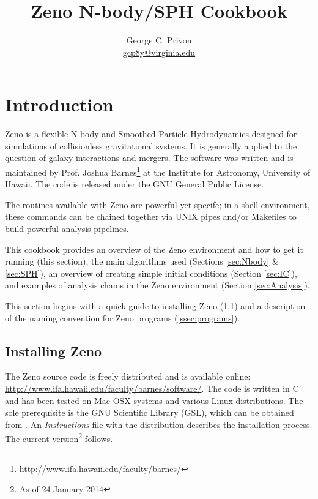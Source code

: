 \documentclass[11pt,letterpaper]{article}
\begin{document}
\title{Zeno N-body/SPH Cookbook}
\author{George C. Privon\\ \href{mailto:gcp8y@virginia.edu}{gcp8y@virginia.edu}}

\maketitle

\section{Introduction}
\label{sec:Introduction}

Zeno is a flexible N-body and Smoothed Particle Hydrodynamics designed for simulations of collisionless gravitational systems. It is generally applied to the question of galaxy interactions and mergers. The software was written and is maintained by Prof. Joshua Barnes\footnote{\url{http://www.ifa.hawaii.edu/faculty/barnes/}} at the Institute for Astronomy, University of Hawaii. The code is released under the GNU General Public License.

The routines available with Zeno are powerful yet specifc; in a shell environment, these commands can be chained together via UNIX pipes and/or Makefiles to build powerful analysis pipelines.

This cookbook provides an overview of the Zeno environment and how to get it running (this section), the main algorithms used (Sections \ref{sec:Nbody} \& \ref{sec:SPH}), an overview of creating simple initial conditions (Section \ref{sec:IC}), and examples of analysis chains in the Zeno environment (Section \ref{sec:Analysis}).

This section begins with a quick guide to installing Zeno (\ref{ssec:installing}) and a description of the naming convention for Zeno programs (\ref{ssec:programs}).


\subsection{Installing Zeno}
\label{ssec:installing}

The Zeno source code is freely distributed and is available online: \url{http://www.ifa.hawaii.edu/faculty/barnes/software/}. The code is written in C and has been tested on Mac OSX systems and various Linux distributions. The sole prerequisite is the GNU Scientific Library (GSL), which can be obtained from \url{}{}. An \textit{Instructions} file with the distribution describes the installation process. The current version\footnote{As of 24 January 2014} follows.
\end{document}
